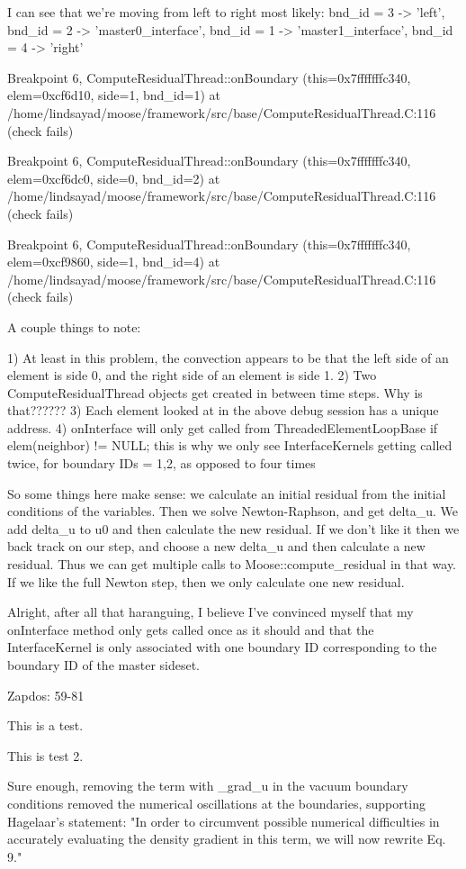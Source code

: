 {I can see that we're moving from left to right most likely: bnd_id = 3 -> 'left', bnd_id = 2 -> 'master0_interface', bnd_id = 1 -> 'master1_interface', bnd_id = 4 -> 'right'

Breakpoint 6, ComputeResidualThread::onBoundary (this=0x7fffffffc340, elem=0xcf6d10, side=1, bnd_id=1) at /home/lindsayad/moose/framework/src/base/ComputeResidualThread.C:116 (check fails)

Breakpoint 6, ComputeResidualThread::onBoundary (this=0x7fffffffc340, elem=0xcf6dc0, side=0, bnd_id=2) at /home/lindsayad/moose/framework/src/base/ComputeResidualThread.C:116 (check fails)

Breakpoint 6, ComputeResidualThread::onBoundary (this=0x7fffffffc340, elem=0xcf9860, side=1, bnd_id=4) at /home/lindsayad/moose/framework/src/base/ComputeResidualThread.C:116 (check fails)

A couple things to note:

1) At least in this problem, the convection appears to be that the left side of an element is side 0, and the right side of an element is side 1.
2) Two ComputeResidualThread objects get created in between time steps. Why is that??????
3) Each element looked at in the above debug session has a unique address.
4) onInterface will only get called from ThreadedElementLoopBase if elem(neighbor) != NULL; this is why we only see InterfaceKernels getting called twice, for boundary IDs = 1,2, as opposed to four times

So some things here make sense: we calculate an initial residual from the initial conditions of the variables. Then we solve Newton-Raphson, and get delta_u. We add delta_u to u0 and then calculate the new residual. If we don't like it then we back track on our step, and choose a new delta_u and then calculate a new residual. Thus we can get multiple calls to Moose::compute_residual in that way. If we like the full Newton step, then we only calculate one new residual.

Alright, after all that haranguing, I believe I've convinced myself that my onInterface method only gets called once as it should and that the InterfaceKernel is only associated with one boundary ID corresponding to the boundary ID of the master sideset.

Zapdos: 59-81

This is a test.

This is test 2.

Sure enough, removing the term with _grad_u in the vacuum boundary conditions removed the numerical oscillations at the boundaries, supporting Hagelaar's statement:  "In order to circumvent possible numerical difficulties in accurately evaluating the density gradient in this term, we will now rewrite Eq. 9."

}
